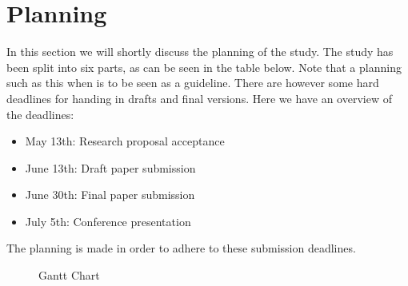 \section{Planning}
\label{sec:planning}

In this section we will shortly discuss the planning of the study.
The study has been split into six parts, as can be seen in the table below.
Note that a planning such as this when is to be seen as a guideline.
There are however some hard deadlines for handing in drafts and final versions.
Here we have an overview of the deadlines:

\begin{itemize}
    \item May 13th: Research proposal acceptance
    \item June 13th: Draft paper submission
    \item June 30th: Final paper submission
    \item July 5th: Conference presentation
\end{itemize}

The planning is made in order to adhere to these submission deadlines.

\begin{figure}[ht]
    \begin{center}
    \end{center}
    \caption{Gantt Chart}
    \label{fig:figure2}
\end{figure}


